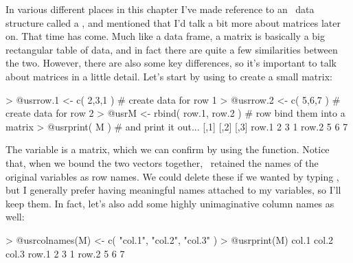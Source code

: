 In various different places in this chapter I've made reference to an \R\ data structure called a , and mentioned that I'd talk a bit more about matrices later on. That time has come. Much like a data frame, a matrix is basically a big rectangular table of data, and in fact there are quite a few similarities between the two. However, there are also some key differences, so it's important to talk about matrices in a little detail. Let's start by using  to create a small matrix:
\begin{rblock1}
> @usr{row.1 <- c( 2,3,1 )}         # create data for row 1
> @usr{row.2 <- c( 5,6,7 )}         # create data for row 2
> @usr{M <- rbind( row.1, row.2 )}  # row bind them into a matrix
> @usr{print( M )}                  # and print it out...
      [,1] [,2] [,3]
row.1    2    3    1
row.2    5    6    7
\end{rblock1}
The variable  is a matrix, which we can confirm by using the  function. Notice that, when we bound the two vectors together, \R\ retained the names of the original variables as row names. We could delete these if we wanted by typing , but I generally prefer having meaningful names attached to my variables, so I'll keep them. In fact, let's also add some highly unimaginative column names as well:
\begin{rblock1}
> @usr{colnames(M) <- c( "col.1", "col.2", "col.3" )}
> @usr{print(M)}
      col.1 col.2 col.3
row.1     2     3     1
row.2     5     6     7
\end{rblock1}
